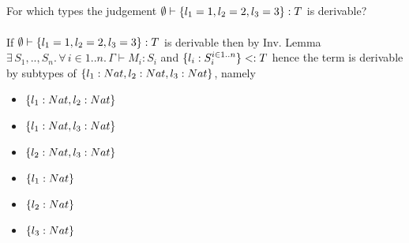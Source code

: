 \subsection{}

For which types the judgement $\emptyset \vdash \{l_1 = 1, l_2 = 2, l_3 = 3\}: T$ is derivable?\\~\\
If $\emptyset \vdash \{l_1 = 1, l_2 = 2, l_3 = 3\}: T$ is derivable then by Inv. Lemma
$\exists\, S_1,..,S_n.\,\forall\, i \in 1..n.\, \Gamma \vdash M_i: S_i$ and
$\{l_i: S_i^{i \in 1..n}\} <: T$ hence the term is derivable by subtypes of
$\{l_1: Nat, l_2: Nat, l_3: Nat\}$, namely
\begin{itemize}
	\item $\{l_1: Nat, l_2: Nat\}$
	\item $\{l_1: Nat, l_3: Nat\}$
	\item $\{l_2: Nat, l_3: Nat\}$
	\item $\{l_1: Nat\}$
	\item $\{l_2: Nat\}$
	\item $\{l_3: Nat\}$
\end{itemize}
